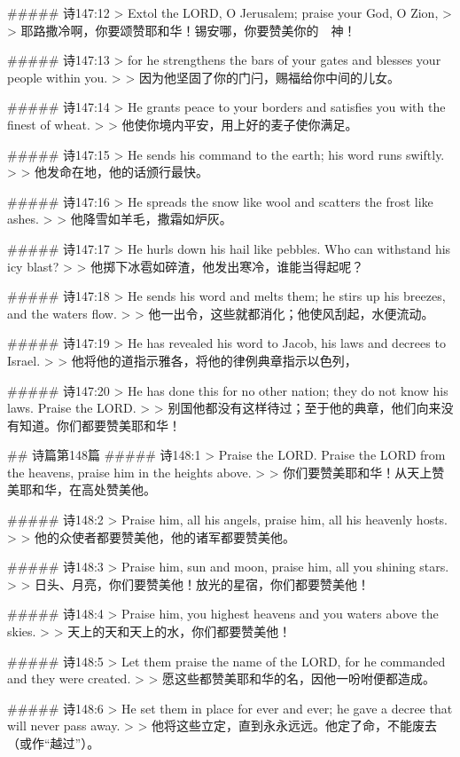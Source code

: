##### 诗147:12
> Extol the LORD, O Jerusalem; praise your God, O Zion,
>
> 耶路撒冷啊，你要颂赞耶和华！锡安哪，你要赞美你的　神！


##### 诗147:13
> for he strengthens the bars of your gates and blesses your people within you.
>
> 因为他坚固了你的门闩，赐福给你中间的儿女。


##### 诗147:14
> He grants peace to your borders and satisfies you with the finest of wheat.
>
> 他使你境内平安，用上好的麦子使你满足。


##### 诗147:15
> He sends his command to the earth; his word runs swiftly.
>
> 他发命在地，他的话颁行最快。


##### 诗147:16
> He spreads the snow like wool and scatters the frost like ashes.
>
> 他降雪如羊毛，撒霜如炉灰。


##### 诗147:17
> He hurls down his hail like pebbles. Who can withstand his icy blast?
>
> 他掷下冰雹如碎渣，他发出寒冷，谁能当得起呢？


##### 诗147:18
> He sends his word and melts them; he stirs up his breezes, and the waters flow.
>
> 他一出令，这些就都消化；他使风刮起，水便流动。


##### 诗147:19
> He has revealed his word to Jacob, his laws and decrees to Israel.
>
> 他将他的道指示雅各，将他的律例典章指示以色列，


##### 诗147:20
> He has done this for no other nation; they do not know his laws. Praise the LORD.
>
> 别国他都没有这样待过；至于他的典章，他们向来没有知道。你们都要赞美耶和华！


## 诗篇第148篇
##### 诗148:1
> Praise the LORD. Praise the LORD from the heavens, praise him in the heights above.
>
> 你们要赞美耶和华！从天上赞美耶和华，在高处赞美他。


##### 诗148:2
> Praise him, all his angels, praise him, all his heavenly hosts.
>
> 他的众使者都要赞美他，他的诸军都要赞美他。


##### 诗148:3
> Praise him, sun and moon, praise him, all you shining stars.
>
> 日头、月亮，你们要赞美他！放光的星宿，你们都要赞美他！


##### 诗148:4
> Praise him, you highest heavens and you waters above the skies.
>
> 天上的天和天上的水，你们都要赞美他！


##### 诗148:5
> Let them praise the name of the LORD, for he commanded and they were created.
>
> 愿这些都赞美耶和华的名，因他一吩咐便都造成。


##### 诗148:6
> He set them in place for ever and ever; he gave a decree that will never pass away.
>
> 他将这些立定，直到永永远远。他定了命，不能废去（或作“越过”）。


